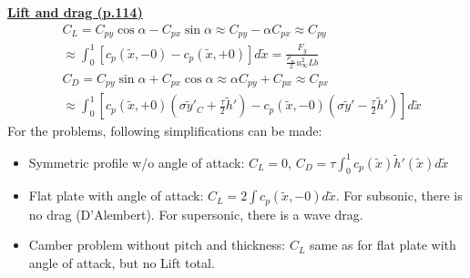 \documentclass[8pt, landscape, fleqn]{scrartcl}
\begin{document}
\begin{multicols*}{3}
\underline{\textbf{Lift and drag (p.114)}}
\begin{align*}
    &C_L = C_{py} \cos \alpha - C_{px} \sin \alpha \approx C_{py} - \alpha C_{px} \approx C_{py} \\
    &\approx \int_0^1 \left[c_p(\tilde{x},-0)-c_p(\tilde{x},+0)\right] d\tilde{x} = \frac{F_y}{\frac{\rho_\infty}{2} u_\infty^2 Lb} \\
    &C_D = C_{py} \sin \alpha + C_{px} \cos \alpha \approx \alpha C_{py} + C_{px} \approx C_{px} \\
    &\approx \int_0^1 \left[  c_p(\tilde{x},+0)\left( \sigma \tilde{y}'_C + \frac{\tau}{2} \tilde{h}' \right) - c_p(\tilde{x},-0)\left( \sigma\tilde{y}'-\frac{\tau}{2}\tilde{h}' \right)\right] d\tilde{x}
\end{align*}
For the problems, following simplifications can be made:
\begin{itemize}
    \item Symmetric profile w/o angle of attack: $C_L = 0$, $C_D = \tau\int_0^1 c_p(\tilde{x})\tilde{h}'(\tilde{x}) d\tilde{x}$ 
    \item Flat plate with angle of attack: $C_L = 2 \int c_p(\tilde{x},-0)d\tilde{x}$. For subsonic, there is no drag (D'Alembert). For supersonic, there is a wave drag.
    \item Camber problem without pitch and thickness: $C_L$ same as for flat plate with angle of attack, but no Lift total.
\end{itemize}

\end{multicols*}
\end{document}

